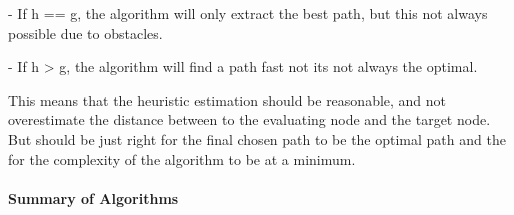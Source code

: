   - If h == g, the algorithm will only extract the best path, but this not always possible due to obstacles.

  - If h > g, the algorithm will find a path fast not its not always the optimal.

  This means that the heuristic estimation should be reasonable, and not overestimate the distance between to the evaluating node and the target node. But should be just right for the final chosen path to be the optimal path and the for the complexity of the algorithm to be at a minimum.

  \paragraph{Summary of Algorithms}

